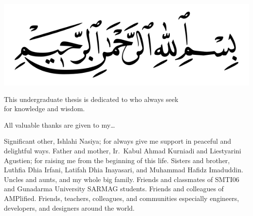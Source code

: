 
\clearpage
\vspace*{\fill}
\begin{minipage}{.8\textwidth}
\begin{center}


\includegraphics[width=\textwidth]{include/basmala}

\hfill

\noindent This undergraduate thesis is dedicated to who always seek\\for knowledge and wisdom.

\hfill

\noindent All valuable thanks are given to my\ldots

\begin{itemize}
\idia Significant other, Ishlahi Nasiya; for always give me support in peaceful and delightful ways.
\idia Father and mother, Ir.\ Kabul Ahmad Kurniadi and Liestyarini Agustien; for raising me from the beginning of this life.
\idia Sisters and brother, Luthfia Dhia Irfani, Latifah Dhia Inayasari, and Muhammad Hafidz Imaduddin.
\idia Uncles and aunts, and my whole big family.
\idia Friends and classmates of SMTI$06$ and Gunadarma University SARMAG students.
\idia Friends and colleagues of AMPlified.
\idia Friends, teachers, colleagues, and communities especially engineers, developers, and designers around the world.
\end{itemize}

\end{center}
\end{minipage}
\vfill %
\clearpage
